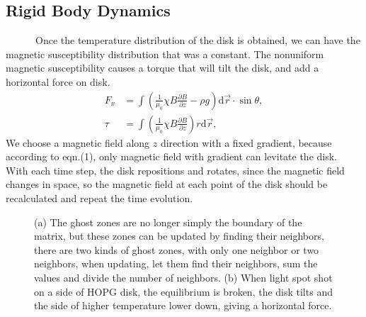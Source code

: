 \documentclass[a4paper,11pt]{article}
\theoremstyle{mytheor}
\begin{document}
\clearpage

\subsection*{Rigid Body Dynamics}

\ \ \ \ \ \ Once the temperature distribution of the disk is obtained, we can have the magnetic susceptibility distribution that was a constant. The nonuniform magnetic susceptibility causes a torque that will tilt the disk, and add a horizontal force on disk. 
\begin{align}
F_x &= \int \left( \frac{1}{\mu_0}\chi B \frac{\partial B}{\partial z} - \rho g \right)\mathrm{d}\vec r \cdot \sin \theta,\\
\tau &= \int \left( \frac{1}{\mu_0}\chi B \frac{\partial B}{\partial z} \right) r \mathrm{d}\vec r,
\end{align}
We choose a magnetic field along $z$ direction with a fixed gradient, because according to eqn.(1), only magnetic field with gradient can levitate the disk. With each time step, the disk repositions and rotates, since the magnetic field changes in space, so the magnetic field at each point of the disk should be recalculated and repeat the time evolution.

\begin{figure}[!htb]
\centering
{}
\caption{(a) The ghost zones are no longer simply the boundary of the matrix, but these zones can be updated by finding their neighbors, there are two kinds of ghost zones, with only one neighbor or two neighbors, when updating, let them find their neighbors, sum the values and divide the number of neighbors. (b) When light spot shot on a side of HOPG disk, the equilibrium is broken, the disk tilts and the side of higher temperature lower down, giving a horizontal force.}
\end{figure}
\end{document}
